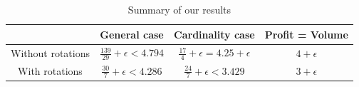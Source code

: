 \begin{table}
\centering{}%
\bgroup
\def\arraystretch{3}
\begin{tabular}{|c|c|c|c|}
\hline 
  & \textbf{General case} & \textbf{Cardinality case}  & \textbf{Profit = Volume} \tabularnewline
\hline 
Without rotations & $\displaystyle\frac{139}{29}+\epsilon < 4.794$ & $\displaystyle\frac{17}{4}+\epsilon = 4.25 + \epsilon$ & $4+\epsilon$  
\tabularnewline\hline
With rotations & $\displaystyle\frac{30}{7}+\epsilon < 4.286$  & $\displaystyle\frac{24}{7}+\epsilon < 3.429$  & $3+\epsilon$ 
\tabularnewline
\hline
\end{tabular}
\egroup
\caption{Summary of our results}
\label{tab:summary}
\end{table}




